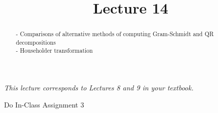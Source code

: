 \documentclass{ximera}
\begin{document}
    \title{Lecture 14}
    
    \begin{abstract} 
        - Comparisons of alternative methods of computing Gram-Schmidt and QR decompositions \\
        - Householder transformation
    \end{abstract}
    \maketitle

\textit{This lecture corresponds to Lectures 8 and 9 in your textbook.}

Do In-Class Assignment 3
\end{document}
